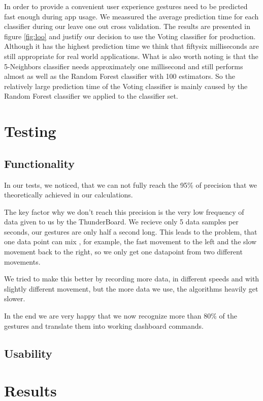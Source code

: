 In order to provide a convenient user experience gestures need to be predicted fast enough during app usage. We meassured the average prediction time for each classifier during our leave one out cross validation. The results are presented in figure \ref{fig:loo} and justify our decision to use the Voting classifier for production. Although it has the highest prediction time we think that fiftysix milliseconds are still appropriate for real world applications. What is also worth noting is that the 5-Neighbors classifier needs approximately one millisecond and still performs almost as well as the Random Forest classifier with 100 estimators. So the relatively large prediction time of the Voting classifier is mainly caused by the Random Forest classifier we applied to the classifier set.


\chapter{Testing}
\label{ch:Tests}

\section{Functionality}
\label{ch:Results:sec:Functionality}

In our tests, we noticed, that we can not fully reach the 95\% of precision that we theoretically achieved in our calculations.

The key factor why we don't reach this precision is the very low frequency of data given to us by the ThunderBoard.
We recieve only 5 data samples per seconds, our gestures are only half a second long.
This leads to the problem, that one data point can mix , for example, the fast movement to the left and the slow movement back to the right, so we only get one datapoint from two different movements.

We tried to make this better by recording more data, in different speeds and with slightly different movement, but the more data we use, the algorithms heavily get slower.

In the end we are very happy that we now recognize more than 80\% of the gestures and translate them into working dashboard commands.


\section{Usability}
\label{ch:Results:sec:Usability}


\chapter{Results}
\label{ch:Results}

